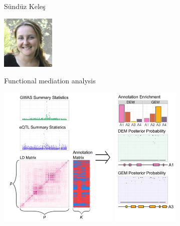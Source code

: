 \documentclass[12pt,t,aspectratio=169]{beamer}
\begin{document}
\begin{frame}{S\"und\"uz Kele\c{s}}

\hspace*{0.85\textwidth}
\includegraphics[height=1in]{Pics/keles.jpg}
\vspace*{-30mm}

{\large Functional mediation analysis}

\bigskip

\includegraphics[height=68mm]{Pics/keles_mediation_A.png}
\includegraphics[height=68mm]{Pics/keles_mediation_B.png}


\end{frame}
\end{document}
